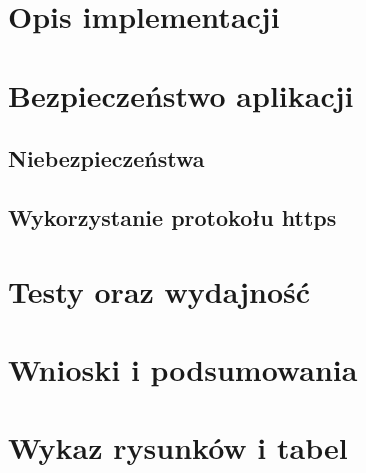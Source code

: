 \documentclass[a4paper,12pt,twoside]{article}
\begin{document}
\section{Opis implementacji}  
\newpage
\section{Bezpieczeństwo aplikacji}  
\subsection{Niebezpieczeństwa}
\subsection{Wykorzystanie protokołu https}

\subsection{}

\newpage
\section{Testy oraz wydajność}  
\newpage
\section{Wnioski i podsumowania}  

\newpage
\begin{thebibliography}{99}
\end{thebibliography}

\newpage
\section*{Wykaz rysunków i tabel} 
\end{document}
